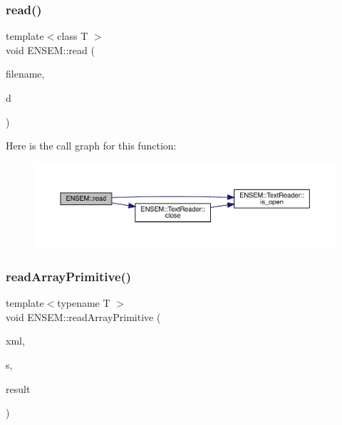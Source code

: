 \subsubsection{\texorpdfstring{read()}{read()}\hspace{0.1cm}{\footnotesize\ttfamily [11/11]}}
{\footnotesize\ttfamily template$<$class T $>$ \\
void E\+N\+S\+E\+M\+::read (\begin{DoxyParamCaption}\item[{const std\+::string \&}]{filename,  }\item[{\mbox{\hyperlink{classENSEM_1_1Ensem}{Ensem}}$<$ T $>$ \&}]{d }\end{DoxyParamCaption})\hspace{0.3cm}{\ttfamily [inline]}}

Here is the call graph for this function\+:\nopagebreak
\begin{figure}[H]
\begin{center}
\leavevmode
\includegraphics[width=350pt]{d2/d94/namespaceENSEM_abba4aaa73ad3238ce36775177195cbdc_cgraph}
\end{center}
\end{figure}
\mbox{\label{namespaceENSEM_a595aa36e757c1e7259eeaf7e6421941c}} 
\subsubsection{\texorpdfstring{readArrayPrimitive()}{readArrayPrimitive()}}
{\footnotesize\ttfamily template$<$typename T $>$ \\
void E\+N\+S\+E\+M\+::read\+Array\+Primitive (\begin{DoxyParamCaption}\item[{\mbox{\hyperlink{classADATXML_1_1XMLReader}{X\+M\+L\+Reader}} \&}]{xml,  }\item[{const std\+::string \&}]{s,  }\item[{\mbox{\hyperlink{classXMLArray_1_1Array}{Array}}$<$ T $>$ \&}]{result }\end{DoxyParamCaption})}



